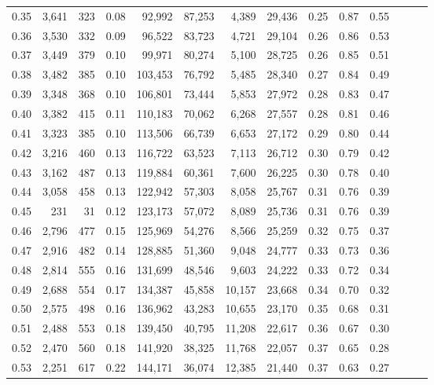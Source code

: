\begin{tabular}{rrrrrrrrrrrrrr}
0.35 &  3,641 &  323 &  0.08 &   92,992 &   87,253 &   4,389 &  29,436 &  0.25 &  0.87 &      0.55 \\
0.36 &  3,530 &  332 &  0.09 &   96,522 &   83,723 &   4,721 &  29,104 &  0.26 &  0.86 &      0.53 \\
0.37 &  3,449 &  379 &  0.10 &   99,971 &   80,274 &   5,100 &  28,725 &  0.26 &  0.85 &      0.51 \\
0.38 &  3,482 &  385 &  0.10 &  103,453 &   76,792 &   5,485 &  28,340 &  0.27 &  0.84 &      0.49 \\
0.39 &  3,348 &  368 &  0.10 &  106,801 &   73,444 &   5,853 &  27,972 &  0.28 &  0.83 &      0.47 \\
0.40 &  3,382 &  415 &  0.11 &  110,183 &   70,062 &   6,268 &  27,557 &  0.28 &  0.81 &      0.46 \\
0.41 &  3,323 &  385 &  0.10 &  113,506 &   66,739 &   6,653 &  27,172 &  0.29 &  0.80 &      0.44 \\
0.42 &  3,216 &  460 &  0.13 &  116,722 &   63,523 &   7,113 &  26,712 &  0.30 &  0.79 &      0.42 \\
0.43 &  3,162 &  487 &  0.13 &  119,884 &   60,361 &   7,600 &  26,225 &  0.30 &  0.78 &      0.40 \\
0.44 &  3,058 &  458 &  0.13 &  122,942 &   57,303 &   8,058 &  25,767 &  0.31 &  0.76 &      0.39 \\
0.45 &    231 &   31 &  0.12 &  123,173 &   57,072 &   8,089 &  25,736 &  0.31 &  0.76 &      0.39 \\
0.46 &  2,796 &  477 &  0.15 &  125,969 &   54,276 &   8,566 &  25,259 &  0.32 &  0.75 &      0.37 \\
0.47 &  2,916 &  482 &  0.14 &  128,885 &   51,360 &   9,048 &  24,777 &  0.33 &  0.73 &      0.36 \\
0.48 &  2,814 &  555 &  0.16 &  131,699 &   48,546 &   9,603 &  24,222 &  0.33 &  0.72 &      0.34 \\
0.49 &  2,688 &  554 &  0.17 &  134,387 &   45,858 &  10,157 &  23,668 &  0.34 &  0.70 &      0.32 \\
0.50 &  2,575 &  498 &  0.16 &  136,962 &   43,283 &  10,655 &  23,170 &  0.35 &  0.68 &      0.31 \\
0.51 &  2,488 &  553 &  0.18 &  139,450 &   40,795 &  11,208 &  22,617 &  0.36 &  0.67 &      0.30 \\
0.52 &  2,470 &  560 &  0.18 &  141,920 &   38,325 &  11,768 &  22,057 &  0.37 &  0.65 &      0.28 \\
0.53 &  2,251 &  617 &  0.22 &  144,171 &   36,074 &  12,385 &  21,440 &  0.37 &  0.63 &      0.27 \\

\end{tabular}

